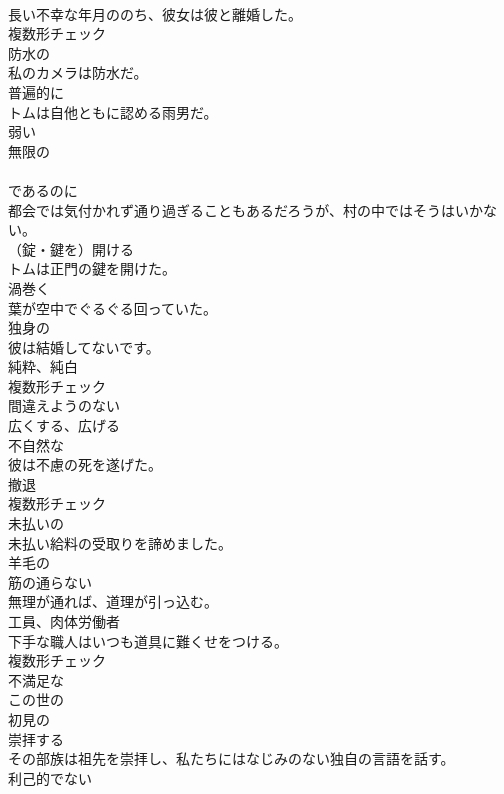 \documentclass[8pt]{extreport}
\begin{document}
\begin{CJK}{UTF8}{min}
\\	長い不幸な年月ののち、彼女は彼と離婚した。	
\\	複数形チェック
\\	[形容詞]	防水の	
\\	私のカメラは防水だ。	
\\	[副詞]	普遍的に	
\\	トムは自他ともに認める雨男だ。	
\\	[形容詞]	弱い	
\\	[形容詞]	無限の	
\\	[接続詞]	
\\	であるのに	
\\	都会では気付かれず通り過ぎることもあるだろうが、村の中ではそうはいかない。	
\\	[動詞]	（錠・鍵を）開ける	
\\	トムは正門の鍵を開けた。	
\\	[動詞]	渦巻く	
\\	葉が空中でぐるぐる回っていた。	
\\	[形容詞]	独身の	
\\	彼は結婚してないです。	
\\	[名詞]	純粋、純白	
\\	複数形チェック
\\	[形容詞]	間違えようのない	
\\	[動詞]	広くする、広げる	
\\	[形容詞]	不自然な	
\\	彼は不慮の死を遂げた。	
\\	[名詞]	撤退	
\\	複数形チェック
\\	[形容詞]	未払いの	
\\	未払い給料の受取りを諦めました。	
\\	[形容詞]	羊毛の	
\\	[形容詞]	筋の通らない	
\\	無理が通れば、道理が引っ込む。	
\\	[名詞]	工員、肉体労働者	
\\	下手な職人はいつも道具に難くせをつける。	
\\	複数形チェック
\\	[形容詞]	不満足な	
\\	[形容詞]	この世の	
\\	[形容詞]	初見の	
\\	[動詞]	崇拝する	
\\	その部族は祖先を崇拝し、私たちにはなじみのない独自の言語を話す。	
\\	[形容詞]	利己的でない	

\end{CJK}
\end{document}
